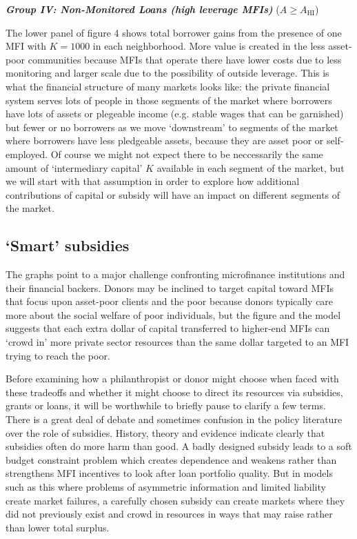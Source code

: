 \documentclass[letterpaper, 12pt]{article}
\begin{document}
\emph{\textbf{{Group IV: Non-Monitored Loans (high leverage
MFIs)}}} (\(A \geq A_{\text{HI}}\))

The lower panel of figure 4 shows total borrower gains from the presence
of one MFI with \(K = 1000\) in each neighborhood. More value is created
in the less asset-poor communities because MFIs that operate there have
lower costs due to less monitoring and larger scale due to the
possibility of outside leverage. This is what the financial structure of
many markets looks like: the private financial system serves lots of
people in those segments of the market where borrowers have lots of
assets or plegeable income (e.g. stable wages that can be garnished) but
fewer or no borrowers as we move `downstream' to segments of the market
where borrowers have less pledgeable assets, because they are asset poor
or self-employed. Of course we might not expect there to be neccessarily
the same amount of `intermediary capital' \(K\) available in each
segment of the market, but we will start with that assumption in order
to explore how additional contributions of capital or subsidy will have
an impact on different segments of the market.


\subsection{`Smart' subsidies}\label{smart-subsidies}

The graphs point to a major challenge confronting microfinance
institutions and their financial backers. Donors may be inclined to
target capital toward MFIs that focus upon asset-poor clients and the
poor because donors typically care more about the social welfare of poor
individuals, but the figure and the model suggests that each extra
dollar of capital transferred to higher-end MFIs can `crowd in' more
private sector resources than the same dollar targeted to an MFI trying
to reach the poor.

Before examining how a philanthropist or donor might choose when faced
with these tradeoffs and whether it might choose to direct its resources
via subsidies, grants or loans, it will be worthwhile to briefly pause
to clarify a few terms. There is a great deal of debate and sometimes
confusion in the policy literature over the role of subsidies. History,
theory and evidence indicate clearly that subsidies often do more harm
than good. A badly designed subsidy leads to a soft budget constraint
problem which creates dependence and weakens rather than strengthens MFI
incentives to look after loan portfolio quality. But in models such as
this where problems of asymmetric information and limited liability
create market failures, a carefully chosen subsidy can create markets
where they did not previously exist and crowd in resources in ways that
may raise rather than lower total surplus.
\end{document}

